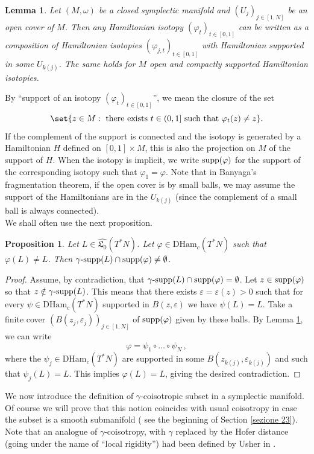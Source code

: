 \documentclass{article}
\newcommand{\1}{\mathbbm{1}}
\newtheorem{lem}[thm]{Lemma}
\newtheorem{prp}[thm]{Proposition}
\theoremstyle{remark}
\begin{document}
{{\begin{lem}\label{Banyaga}
Let $(M,\omega)$ be a closed symplectic 
manifold and $(U_j)_{j \in [1,N]}$ be an open cover of $M$. Then any Hamiltonian isotopy $(\varphi_t)_{t \in [0,1]}$ can be written as a 
composition of Hamiltonian isotopies $(\varphi_{j,t})_{t \in [0,1]}$ with Hamiltonian supported in some $U_{k(j)}$. The same holds for $M$ open and compactly supported Hamiltonian isotopies.
\end{lem}
\noindent By ``support of an isotopy $(\varphi_t)_{t \in [0,1]}$'', we mean the closure of the set $$\set{ z \in M: \text{ there exists } t \in (0,1] \text{ such that } \varphi_t(z) \ne z }.$$ 
If the complement of the support is connected and the isotopy is generated by a Hamiltonian $H$ defined on $[0,1] \times M$, this is also the projection on $M$ of the support of $H$. When
the isotopy is implicit, we write $\textnormal{supp}(\varphi)$ for the support of the corresponding isotopy such that $\varphi_1 = \varphi$. Note that in Banyaga’s fragmentation theorem, if the open cover is by small balls, we may assume the support of the Hamiltonians are in the $U_{k(j)}$ (since the complement of a small ball is always connected). \\
We shall often use the next proposition.
\begin{prp} \label{serve dopo}
Let $L \in\widehat{\mathfrak{L}_0}(T^*N)$. Let $\varphi\in \mathrm{DHam}_c(T^*N)$ such that $\varphi (L) \ne L$. Then
$\gamma\textnormal{-supp}(L)\cap \textnormal{supp}(\varphi)\neq\emptyset$.
\end{prp}
\begin{proof} Assume, by contradiction, that $\gamma\textnormal{-supp}(L) \cap \textnormal{supp}(\varphi) = \emptyset$. Let $z \in \textnormal{supp}(\varphi)$ so that $z \notin \gamma\textnormal{-supp}(L)$. This means that there exists $\varepsilon = \varepsilon(z) > 0$ such that for every $\psi \in \mathrm{DHam}_c(T^*N)$ supported in $B(z,\varepsilon)$ we have $\psi(L) = L$. Take a finite cover $(B(z_j,\varepsilon_j))_{j \in [1,N]}$ of $\textnormal{supp}(\varphi)$ given by these balls. By Lemma \ref{Banyaga}, we can write
$$\varphi = \psi_1 \circ \ldots \circ \psi_N\, ,$$
where the $\psi_j \in \mathrm{DHam}_c(T^*N)$ are supported in some $B(z_{k(j)},\varepsilon_{k(j)})$ and such that $\psi_j(L) = L$. This implies $\varphi(L) = L$, giving the desired contradiction. 
\end{proof}
\indent We now introduce the definition of $\gamma$-coisotropic subset in a symplectic manifold. Of course we will prove that this notion coincides with usual coisotropy in  case the subset is a smooth submanifold ( see the beginning of Section \ref{sezione 23}). Note that an analogue of $\gamma$-coisotropy, with $\gamma$ replaced by the Hofer distance (going under the name of “local rigidity”) had been defined by Usher in \cite{ush19}. \\
}}
\end{document}
